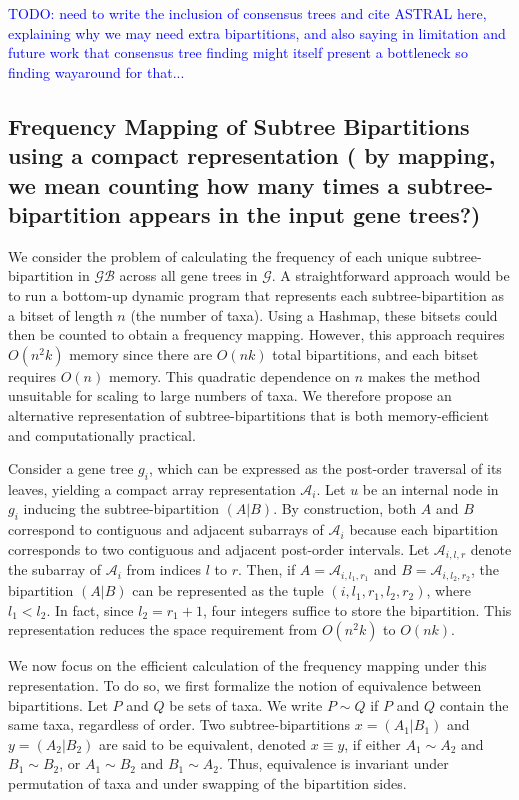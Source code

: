 \documentclass[10pt,a4paper]{article}
\newcommand{\addb}[1]{{\color{red} #1}}
\begin{document}
\textcolor{blue}{TODO: need to write the inclusion of consensus trees and cite ASTRAL here, explaining why we may need extra bipartitions, and also saying in limitation and future work that consensus tree finding might itself present a bottleneck so finding wayaround for that...} 


\subsection{Frequency Mapping of Subtree Bipartitions using a compact representation (\addb{by mapping, we mean counting how many times a subtree-bipartition appears in the input gene trees?})}
\label{subsec:freq-mapping}

We consider the problem of calculating the frequency of each unique subtree-bipartition in $\mathcal{GB}$ across all gene trees in $\mathcal{G}$. A straightforward approach would be to run a bottom-up dynamic program that represents each subtree-bipartition as a bitset of length $n$ (the number of taxa). Using a Hashmap, these bitsets could then be counted to obtain a frequency mapping. However, this approach requires $O(n^{2}k)$ memory since there are $O(nk)$ total bipartitions, and each bitset requires $O(n)$ memory. This quadratic dependence on $n$ makes the method unsuitable for scaling to large numbers of taxa. We therefore propose an alternative representation of subtree-bipartitions that is both memory-efficient and computationally practical.

Consider a gene tree $g_i$, which can be expressed as the post-order traversal of its leaves, yielding a compact array representation $\mathcal{A}_i$. Let $u$ be an internal node in $g_i$ inducing the subtree-bipartition $(A|B)$. By construction, both $A$ and $B$ correspond to contiguous and adjacent subarrays of $\mathcal{A}_i$ because each bipartition corresponds to two contiguous and adjacent post-order intervals. Let $\mathcal{A}_{i,l,r}$ denote the subarray of $\mathcal{A}_i$ from indices $l$ to $r$. Then, if $A = \mathcal{A}_{i,l_1,r_1}$ and $B = \mathcal{A}_{i,l_2,r_2}$, the bipartition $(A|B)$ can be represented as the tuple $(i,l_1,r_1,l_2,r_2)$, where $l_1 < l_2$. In fact, since $l_2 = r_1 + 1$, four integers suffice to store the bipartition. This representation reduces the space requirement from $O(n^{2}k)$ to $O(nk)$.

We now focus on the efficient calculation of the frequency mapping under this representation. To do so, we first formalize the notion of equivalence between bipartitions. Let $P$ and $Q$ be sets of taxa. We write $P \sim Q$ if $P$ and $Q$ contain the same taxa, regardless of order. Two subtree-bipartitions $x = (A_1|B_1)$ and $y = (A_2|B_2)$ are said to be equivalent, denoted $x \equiv y$, if either $A_1 \sim A_2$ and $B_1 \sim B_2$, or $A_1 \sim B_2$ and $B_1 \sim A_2$. Thus, equivalence is invariant under permutation of taxa and under swapping of the bipartition sides.
\end{document}
